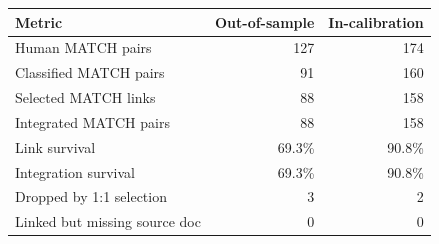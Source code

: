 \begin{tabular}{lrr}
\toprule
Metric & Out-of-sample & In-calibration \\
\midrule
Human MATCH pairs & 127 & 174 \\
Classified MATCH pairs & 91 & 160 \\
Selected MATCH links & 88 & 158 \\
Integrated MATCH pairs & 88 & 158 \\
Link survival & 69.3\% & 90.8\% \\
Integration survival & 69.3\% & 90.8\% \\
Dropped by 1:1 selection & 3 & 2 \\
Linked but missing source doc & 0 & 0 \\
\bottomrule
\end{tabular}
